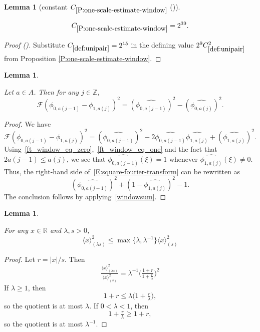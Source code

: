 \documentclass[12pt,reqno]{amsart}
\newcommand{\auto}{{({\tiny\faCar})}}
\theoremstyle{plain}
\newtheorem{lemma}[theorem]{Lemma}
\numberwithin{equation}{section}
\theoremstyle{remark}
\newcommand{\uses}[1]{}
\newcommand{\usesdefs}[1]{}
\newcommand{\leanok}{}
\newcommand{\lean}[1]{}
\newcommand{\Z}{{\mathbb Z}}
\newcommand{\R}{{\mathbb R}}
\begin{document}
\begin{lemma}[constant $C_{\ref{P:one-scale-estimate-window}}$ \auto]\label{auto:constant-one-scale-window}\uses{P:one-scale-estimate-window}\usesdefs{def:unipair}
\lean{Auto.constantOneScaleWindow}
\leanok
\begin{equation}\label{auto:constant-one-scale-window-bound}
C_{\ref{P:one-scale-estimate-window}}=2^{39}.
\end{equation}
\end{lemma}
\begin{proof}[Proof \auto]
Substitute $C_{\ref{def:unipair}}=2^{15}$ in the defining value $2^9C_{\ref{def:unipair}}^2$ from Proposition \ref{P:one-scale-estimate-window}.
\end{proof}

\begin{lemma}\label{L:fourier-transform-window}\uses{}\usesdefs{multiplicatively spaced monotone sequences,def:cn-window,def:cpair,def:unipair}
\lean{Auto.fourierTransformWindow}
\leanok
Let $a\in A$. Then for any $j\in \Z$,
\begin{equation}\label{auto:window-square-Fourier-identity}
\mathcal F({\phi}_{0,a(j-1)}-{\phi}_{1,a(j)})^2=
(\widehat{{\phi}_{0,a(j-1)}})^2-(\widehat{{\phi}_{0,a(j)}})^2.
\end{equation}
\end{lemma}

\begin{proof}
We have
\begin{equation}\label{E:square-fourier-transform}
\mathcal F({\phi}_{0,a(j-1)}-{\phi}_{1,a(j)})^2=
(\widehat{{\phi}_{0,a(j-1)}})^2 - 2 \widehat{{\phi}_{0,a(j-1)}} \widehat{{\phi}_{1,a(j)}} +(\widehat{{\phi}_{1,a(j)}})^2.
\end{equation}
Using~\eqref{ft_window_eq_zero},~\eqref{ft_window_eq_one} and the fact that $2a(j-1) \leq a(j)$, we see that $\widehat{{\phi}_{0,a(j-1)}}(\xi)=1$ whenever $\widehat{{\phi}_{1,a(j)}}(\xi) \neq 0$. Thus, the right-hand side of~\eqref{E:square-fourier-transform} can be rewritten as
\[
(\widehat{{\phi}_{0,a(j-1)}})^2 +(1-\widehat{{\phi}_{1,a(j)}})^2-1.
\]
The conclusion follows by applying~\eqref{windowsum}.
\end{proof}

\begin{lemma} \label{lem:scaleest}\uses{}\usesdefs{bracket bump}
\lean{Auto.scaleEstimate}
\leanok
    For any $x\in \R$ and $\lambda, s>0$,
    \begin{equation}\label{auto:scaled-bracket-comparison}\langle x \rangle^2_{(\lambda s)} \le \max\{\lambda,\lambda^{-1}\}\langle x \rangle^2_{(s)}\end{equation}
\end{lemma}
\begin{proof}
    Let $r=|x|/s$. Then
    \[\tfrac{\langle x \rangle^2_{(\lambda s)} }{\langle x \rangle^2_{(s)}} = \lambda^{-1}\Big(\tfrac{1+r}{1+\tfrac{r}{\lambda}} \Big)^2\]
    If $\lambda\ge 1$, then
    \[1+r\le \lambda\Big(1+\tfrac{r}{\lambda} \Big),\]
    so the quotient is at most $\lambda$. If $0<\lambda <1$, then
    \[1+\tfrac{r}{\lambda}\ge 1+ r,\]
    so the quotient is at most $\lambda^{-1}$.
\end{proof}
\end{document}
